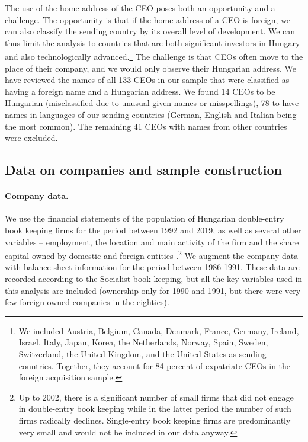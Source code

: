 \documentclass[12pt,a4paper]{article}
\begin{document}
The use of the home address of the CEO poses both an opportunity and a challenge. The opportunity is that if the home address of a CEO is foreign, we can also classify the sending country by its overall level of development. We can thus limit the analysis to countries that are both significant investors in Hungary and also technologically advanced.\footnote{We included Austria, Belgium, Canada, Denmark, France, Germany, Ireland, Israel, Italy, Japan, Korea, the Netherlands, Norway, Spain, Sweden, Switzerland, the United Kingdom, and the United States as sending countries. Together, they account for 84 percent of expatriate CEOs in the foreign acquisition sample.} The challenge is that CEOs often move to the place of their company, and we would only observe their Hungarian address. We have reviewed the names of all 133 CEOs in our sample that were classified as having a foreign name and a Hungarian address. We found 14 CEOs to be Hungarian (misclassified due to unusual given names or misspellings), 78 to have names in languages of our sending countries (German, English and Italian being the most common). The remaining 41 CEOs with names from other countries were excluded.


\subsection{Data on companies and sample construction}

\paragraph{Company data.} We use the financial statements of the population of Hungarian double-entry book keeping firms for the period between 1992 and 2019, as well as several other variables -- employment, the location and main activity of the firm and the share capital owned by domestic and foreign entities \citep{merleg}.\footnote{Up to 2002, there is a significant number of small firms that did not engage in double-entry book keeping while in the latter period the number of such firms radically declines. Single-entry book keeping firms are predominantly very small and would not be included in our data anyway.} We augment the company data with balance sheet information for the period between 1986-1991. These data are recorded according to the Socialist book keeping, but all the key variables used in this analysis are included (ownership only for 1990 and 1991, but there were very few foreign-owned companies in the eighties).
\end{document}
